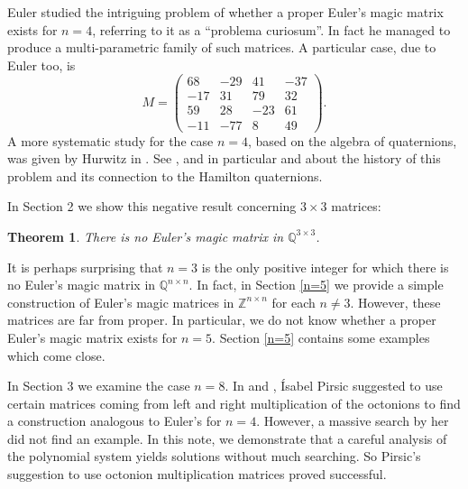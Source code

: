 \documentclass[12pt]{amsart}
\newtheorem{theorem}{Theorem}[section]
\theoremstyle{definition}
\newcommand{\QQ}{\mathbb Q}
\newcommand{\ZZ}{\mathbb Z}
\begin{document}
Euler studied the intriguing problem of whether a proper Euler's magic
matrix exists for $n=4$, referring to it as a ``problema
curiosum''. In fact he managed to produce a multi-parametric family of
such matrices. A particular case, due to Euler too, is\[
  M = \begin{pmatrix}68& -29& 41& -37\\
    -17& 31& 79& 32\\
    59& 28& -23& 61\\
    -11& -77& 8& 49
  \end{pmatrix}.
\]
A more systematic study for the case $n=4$, based on the algebra of
quaternions, was given by Hurwitz in \cite[Vorlesung
12]{hurwitz:quaternionen}. See \cite{boyer}, \cite{pirsic:msb} and in
particular \cite{oswald_steuding} and \cite[Lecture
12]{oswald_steuding:book} about the history of this problem and its
connection to the Hamilton quaternions.

In Section 2 we show this negative result concerning $3\times3$ matrices:
\begin{theorem}\label{t:3x3}
  There is no Euler's magic matrix in $\QQ^{3\times 3}$.
\end{theorem}
It is perhaps surprising that $n=3$ is the only positive integer for
which there is no Euler's magic matrix in $\QQ^{n\times n}$. In fact,
in Section \ref{n=5} we provide a simple construction of Euler's magic
matrices in $\ZZ^{n\times n}$ for each $n\ne3$. However, these
matrices are far from proper. In particular, we do not know whether
a proper Euler's magic matrix exists for $n=5$. Section \ref{n=5}
contains some examples which come close.

In Section 3 we examine the case $n=8$. In \cite{pirsic:arxiv} and
\cite{pirsic:msb}, \'Isabel Pirsic suggested to use certain matrices
coming from left and right multiplication of the octonions to find a
construction analogous to Euler's for $n=4$. However, a massive search
by her did not find an example. In this note, we demonstrate that a
careful analysis of the polynomial system yields solutions without
much searching. So Pirsic's suggestion to use octonion multiplication
matrices proved successful.
\end{document}
